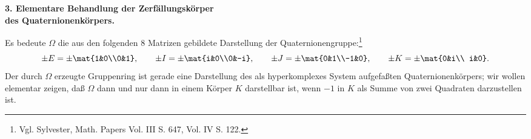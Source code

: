 \begin{center}
\textbf{3. Elementare Behandlung der Zerfällungskörper\\
des Quaternionenkörpers.}
\end{center}

Es bedeute $\Omega$ die aus den folgenden 8 Matrizen gebildete Darstellung der Quaternionengruppe:\footnote{Vgl. Sylvester, Math. Papers Vol. III S. 647, Vol. IV S. 122.}
\[
\pm E=\pm\mat{1&0\\0&1},\qquad
\pm I=\pm\mat{i&0\\0&-i},\qquad
\pm J=\pm\mat{0&1\\-1&0},\qquad
\pm K=\pm\mat{0&i\\ i&0}.
\]
Der durch $\Omega$ erzeugte Gruppenring ist gerade eine Darstellung des als hyperkomplexes System aufgefaßten Quaternionenkörpers; wir wollen elementar zeigen, daß $\Omega$ dann und nur dann in einem Körper $K$ darstellbar ist, wenn $-1$ in $K$ als Summe von zwei Quadraten darzustellen ist.
